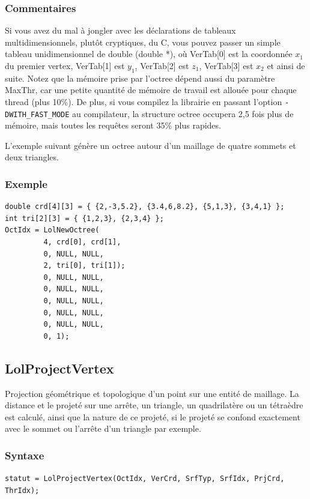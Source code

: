 \documentclass[a4paper,12pt]{article}
\begin{document}
\subsubsection*{Commentaires}
Si vous avez du mal à jongler avec les déclarations de tableaux multidimensionnels, plutôt cryptiques, du C, vous pouvez passer un simple tableau unidimensionnel de double (double *), où VerTab[0] est la coordonnée $x_1$ du premier vertex, VerTab[1] est $y_1$, VerTab[2] est $z_1$, VerTab[3] est $x_2$ et ainsi de suite.
Notez que la mémoire prise par l'octree dépend aussi du paramètre MaxThr, car une petite quantité de mémoire de travail est allouée pour chaque thread (plus 10\%).
De plus, si vous compilez la librairie en passant l'option {\tt -DWITH\_FAST\_MODE} au compilateur, la structure octree occupera 2,5 fois plus de mémoire, mais toutes les requêtes seront 35\% plus rapides.

L'exemple suivant génère un octree autour d'un maillage de quatre sommets et deux triangles.

\subsubsection*{Exemple}

\begin{tt}
\begin{verbatim}
double crd[4][3] = { {2,-3,5.2}, {3.4,6,8.2}, {5,1,3}, {3,4,1} };
int tri[2][3] = { {1,2,3}, {2,3,4} };
OctIdx = LolNewOctree(
         4, crd[0], crd[1],
         0, NULL, NULL,
         2, tri[0], tri[1]);
         0, NULL, NULL,
         0, NULL, NULL,
         0, NULL, NULL,
         0, NULL, NULL,
         0, NULL, NULL,
         0, 1);
\end{verbatim}
\end{tt}
\normalfont


\subsection{LolProjectVertex}
Projection géométrique et topologique d'un point sur une entité de maillage. La distance et le projeté sur une arrête, un triangle, un quadrilatère ou un tétraèdre est calculé, ainsi que la nature de ce projeté, si le projeté se confond exactement avec le sommet ou l'arrête d'un triangle par exemple.

\subsubsection*{Syntaxe}
{\tt statut = LolProjectVertex(OctIdx, VerCrd, SrfTyp, SrfIdx, PrjCrd, ThrIdx);}
\end{document}
